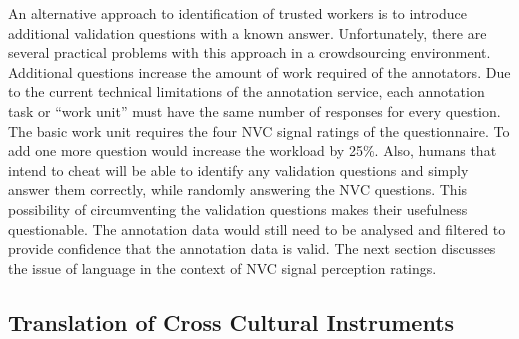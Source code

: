 
An alternative approach to identification of trusted workers is to introduce additional validation questions with a known answer. Unfortunately, there are several practical problems with this approach in a crowdsourcing environment. Additional questions increase the amount of work required of the annotators. Due to the current technical limitations of the annotation service, each annotation task or ``work unit'' must have the same number of responses for every question. The basic work unit requires the four \ac{NVC} signal ratings of the questionnaire. To add one more question would increase the workload by 25\%. Also, humans that intend to cheat will be able to identify any validation questions and simply answer them correctly, while randomly answering the \ac{NVC} questions. This possibility of circumventing the validation questions makes their usefulness questionable. The annotation data would still need to be analysed and filtered to provide confidence that the annotation data is valid. The next section discusses the issue of language in the context of \ac{NVC} signal perception ratings.

\subsection{Translation of Cross Cultural Instruments}
\label{SectionTranslationOfInstrument}

